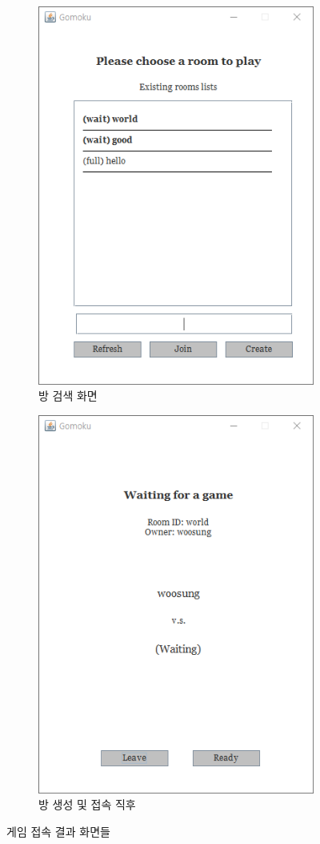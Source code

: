 \documentclass[a4paper, 10pt]{article}
\begin{document}
\begin{figure}[h]
\begin{subfigure}{.3\textwidth}
    \includegraphics[width=.8\linewidth]{resource/room_search}
    \caption{방 검색 화면}
    \label{fig:room_search}
  \end{subfigure}
  \begin{subfigure}{.3\textwidth}
    \centering
    \includegraphics[width=.8\linewidth]{resource/waiting}
    \caption{방 생성 및 접속 직후}
    \label{fig:draw}
  \end{subfigure}
  \caption{게임 접속 결과 화면들}
\end{figure}
\newpage
\end{document}
